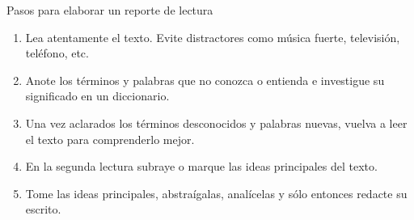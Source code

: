 \documentclass[letterpaper,12pt,twocolumn]{article}
\begin{document}
Pasos para elaborar un reporte de lectura
\begin{enumerate}[noitemsep]
	\item Lea atentamente el texto. Evite distractores como música fuerte, televisión, teléfono, etc.
	\item Anote los términos y palabras que no conozca o entienda e investigue su significado en un diccionario.
	\item Una vez aclarados los términos desconocidos y palabras nuevas, vuelva a leer el texto para comprenderlo mejor.
	\item En la segunda lectura subraye o marque las ideas principales del texto.
	\item Tome las ideas principales, abstraígalas, analícelas y sólo entonces redacte su escrito.
\end{enumerate}
\end{document}
